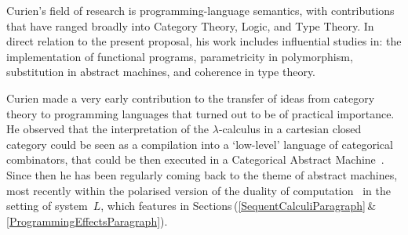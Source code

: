 \documentclass[11pt,twocolumn]{article}
\newcommand{\hide}[1]{}
\newcommand{\SysL}{$L$}%
\begin{document}
Curien's field of research is programming-language semantics, with
contributions that have ranged broadly into Category Theory, Logic, and
Type Theory.  In direct relation to the present proposal, his work
includes influential studies in:
%
%
the implementation of functional programs,
%
parametricity in polymorphism,
%
substitution in abstract machines,
%
and 
%
coherence in type theory.

%
%
Curien %
made a very early contribution to the transfer of ideas from category
theory to programming languages that turned out to be of practical
importance.  He observed that the interpretation of the
\mbox{$\lambda$-calculus} in a cartesian closed category could be seen as
a compilation into a `low-level' language of categorical combinators, that
could be then executed in a Categorical Abstract Machine~\cite{CAM}.
%
Since then he has been regularly coming back to the theme of abstract
machines, most recently within the polarised version of the duality of
computation~\cite{CurienMunch} in the setting of system~{\SysL}, which
features in Sections\,(\ref{SequentCalculiParagraph}\,\&\,%
\ref{ProgrammingEffectsParagraph}).

\hide{
Curien has been following developments in 
higher-dimensional category theory and al\-ge\-bra\-ic operads; and he 
is now interested in higher-dimensional rewriting.  These topics intersect
the proposal at various points of
\mbox{Sections\,(\ref{AlgebraicTypeTheoryParagraph}},\,%
\mbox{\ref{IntensionalTypeTheoryParagraph}},\,\&\,%
\mbox{\ref{DirectedTypeTheoryParagraph}}).
}

\end{document}

